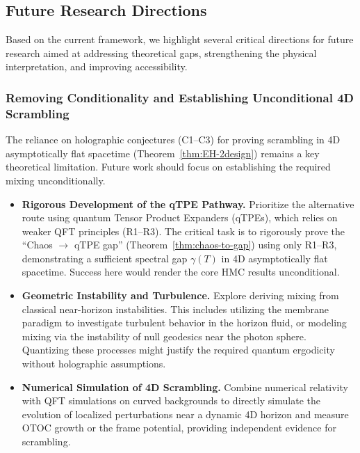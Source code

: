 \documentclass[11pt,a4paper]{article}
\theoremstyle{plain}
\theoremstyle{definition}
\theoremstyle{remark}
\begin{document}




\subsection{Future Research Directions}
\label{sec:future}
Based on the current framework, we highlight several critical directions for future research aimed at addressing theoretical gaps, strengthening the physical interpretation, and improving accessibility.

\subsubsection{Removing Conditionality and Establishing Unconditional 4D Scrambling}
The reliance on holographic conjectures (C1--C3) for proving scrambling in 4D asymptotically flat spacetime (Theorem~\ref{thm:EH-2design}) remains a key theoretical limitation. Future work should focus on establishing the required mixing unconditionally.
\begin{itemize}
    \item \textbf{Rigorous Development of the qTPE Pathway.} Prioritize the alternative route using quantum Tensor Product Expanders (qTPEs), which relies on weaker QFT principles (R1--R3). The critical task is to rigorously prove the ``Chaos $\to$ qTPE gap'' (Theorem~\ref{thm:chaos-to-gap}) using only R1--R3, demonstrating a sufficient spectral gap $\gamma(T)$ in 4D asymptotically flat spacetime. Success here would render the core HMC results unconditional.
    \item \textbf{Geometric Instability and Turbulence.} Explore deriving mixing from classical near-horizon instabilities. This includes utilizing the membrane paradigm to investigate turbulent behavior in the horizon fluid, or modeling mixing via the instability of null geodesics near the photon sphere. Quantizing these processes might justify the required quantum ergodicity without holographic assumptions.
    \item \textbf{Numerical Simulation of 4D Scrambling.} Combine numerical relativity with QFT simulations on curved backgrounds to directly simulate the evolution of localized perturbations near a dynamic 4D horizon and measure OTOC growth or the frame potential, providing independent evidence for scrambling.
\end{itemize}
\end{document}
